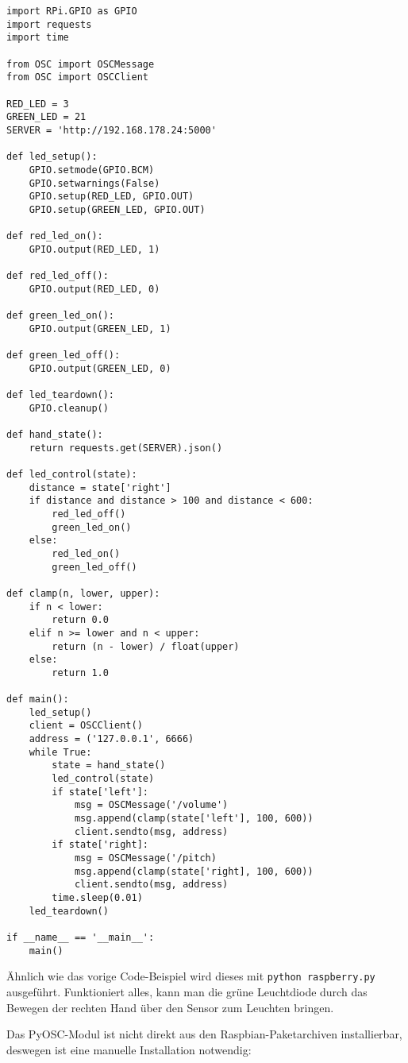 \documentclass[a4paper, fontsize=12pt, toc=bibliographynumbered]{scrreprt}
\newcommand{\mono}[1]{\texttt{#1}}
\begin{document}
\begin{verbatim}
import RPi.GPIO as GPIO
import requests
import time

from OSC import OSCMessage
from OSC import OSCClient

RED_LED = 3
GREEN_LED = 21
SERVER = 'http://192.168.178.24:5000'

def led_setup():
    GPIO.setmode(GPIO.BCM)
    GPIO.setwarnings(False)
    GPIO.setup(RED_LED, GPIO.OUT)
    GPIO.setup(GREEN_LED, GPIO.OUT)

def red_led_on():
    GPIO.output(RED_LED, 1)

def red_led_off():
    GPIO.output(RED_LED, 0)

def green_led_on():
    GPIO.output(GREEN_LED, 1)

def green_led_off():
    GPIO.output(GREEN_LED, 0)

def led_teardown():
    GPIO.cleanup()

def hand_state():
    return requests.get(SERVER).json()

def led_control(state):
    distance = state['right']
    if distance and distance > 100 and distance < 600:
        red_led_off()
        green_led_on()
    else:
        red_led_on()
        green_led_off()

def clamp(n, lower, upper):
    if n < lower:
        return 0.0
    elif n >= lower and n < upper:
        return (n - lower) / float(upper)
    else:
        return 1.0

def main():
    led_setup()
    client = OSCClient()
    address = ('127.0.0.1', 6666)
    while True:
        state = hand_state()
        led_control(state)
        if state['left']:
            msg = OSCMessage('/volume')
            msg.append(clamp(state['left'], 100, 600))
            client.sendto(msg, address)
        if state['right]:
            msg = OSCMessage('/pitch)
            msg.append(clamp(state['right], 100, 600))
            client.sendto(msg, address)
        time.sleep(0.01)
    led_teardown()

if __name__ == '__main__':
    main()
\end{verbatim}

Ähnlich wie das vorige Code-Beispiel wird dieses mit \mono{python
  raspberry.py} ausgeführt.  Funktioniert alles, kann man die grüne
Leuchtdiode durch das Bewegen der rechten Hand über den Sensor zum
Leuchten bringen.

Das PyOSC-Modul ist nicht direkt aus den Raspbian-Paketarchiven
installierbar, deswegen ist eine manuelle Installation notwendig:
\end{document}
